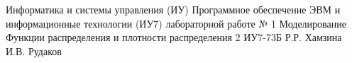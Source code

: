 \documentclass{bmstu}
\begin{document}
\makereporttitle
	{Информатика и системы управления (ИУ)}
	{Программное обеспечение ЭВМ и информационные технологии (ИУ7)}
	{лабораторной работе № 1}
	{Моделирование}
	{Функции распределения и плотности распределения}
	{2}
	{ИУ7-73Б}
	{Р.Р. Хамзина}
	{И.В. Рудаков}

\maketableofcontents


\end{document}
